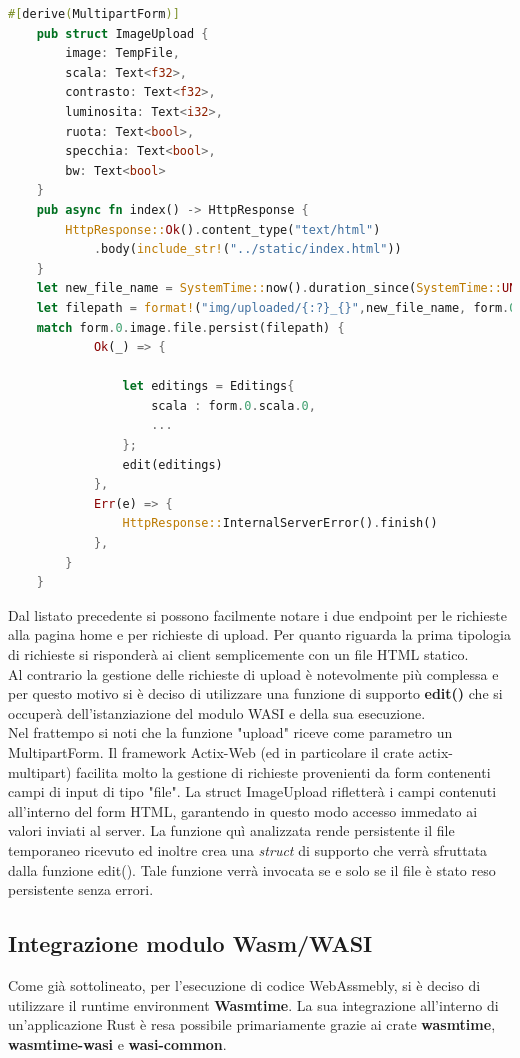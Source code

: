\begin{lstlisting}[language=Rust, showstringspaces=false]
    #[derive(MultipartForm)]
    pub struct ImageUpload {
        image: TempFile,
        scala: Text<f32>,
        contrasto: Text<f32>,
        luminosita: Text<i32>,
        ruota: Text<bool>,
        specchia: Text<bool>,
        bw: Text<bool>
    }
    pub async fn index() -> HttpResponse {
        HttpResponse::Ok().content_type("text/html")
            .body(include_str!("../static/index.html"))
    }
    let new_file_name = SystemTime::now().duration_since(SystemTime::UNIX_EPOCH).unwrap();
    let filepath = format!("img/uploaded/{:?}_{}",new_file_name, form.0.file_name.as_str());
    match form.0.image.file.persist(filepath) {
            Ok(_) => {
                
                let editings = Editings{
                    scala : form.0.scala.0,
                    ...
                };
                edit(editings)
            },
            Err(e) => {
                HttpResponse::InternalServerError().finish()
            },
        }
    }
\end{lstlisting}
Dal listato precedente si possono facilmente notare i due endpoint per le richieste alla pagina home e per richieste di upload.
Per quanto riguarda la prima tipologia di richieste si risponderà ai client semplicemente con un file HTML statico.
\\Al contrario la gestione delle richieste di upload è notevolmente più complessa e per questo motivo si è deciso di utilizzare una funzione di supporto \textbf{edit()} che si occuperà dell'istanziazione del modulo WASI e della sua esecuzione.
\\Nel frattempo si noti che la funzione "upload" riceve come parametro un MultipartForm.
Il framework Actix-Web (ed in particolare il crate actix-multipart) facilita molto la gestione di richieste provenienti da form contenenti campi di input di tipo "file".
La struct ImageUpload rifletterà i campi contenuti all'interno del form HTML, garantendo in questo modo accesso immedato ai valori inviati al server.
La funzione quì analizzata rende persistente il file temporaneo ricevuto ed inoltre crea una \emph{struct} di supporto che verrà sfruttata dalla funzione edit(). Tale funzione verrà invocata se e solo se il file è stato reso persistente senza errori.
\subsection{Integrazione modulo Wasm/WASI}
Come già sottolineato, per l'esecuzione di codice WebAssmebly, si è deciso di utilizzare il runtime environment \textbf{Wasmtime}. La sua integrazione all'interno di un'applicazione Rust è resa possibile primariamente grazie ai crate \textbf{wasmtime}, \textbf{wasmtime-wasi} e \textbf{wasi-common}.
